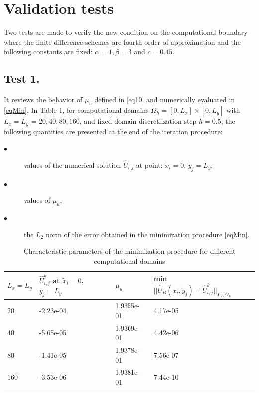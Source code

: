\documentclass[12pt]{article}
\theoremstyle{theorem}
\theoremstyle{defi}
\begin{document}
\section{Validation tests}

Two tests are made to verify the new condition on the computational boundary where the finite difference schemes are fourth order of approximation and the following constants are fixed:
 $\alpha = 1, \beta = 3$  and  $c = 0.45$.

\subsection{Test 1.}

It reviews the behavior of $\mu_u$  defined in  \eqref{eq10} and numerically evaluated in \eqref{eqMin}. In Table 1, for computational domains  $\tilde \Omega_h = [0, L_{ x}] \times  [0, L_{ y}]$
with $ L_{ x} = L_{ y}$ = $20, 40, 80, 160$, and fixed domain discretiization step $h = 0.5$, the following quantities are presented at the end of the iteration procedure:

\begin{description}
  \item[$\bullet$]values of the numerical solution $\widehat{U}_{i,j}$  at point: $\tilde {x}_i = 0$, $ \tilde {y}_j =   L_{ y}$,
  \item[$\bullet$ ] values of $\mu_u$,
  \item[$\bullet$ ] the $L_2$  norm of the error obtained in the minimization procedure \eqref{eqMin}.
\end{description}


\begin{center}
\begin{table}[ht]
\centering
		\begin{tabular}{||C{1.5cm}||C{2.6cm}|C{1.9cm}|C{4.2cm}||}
			\hline
			\hline
      $ L_{ x} = L_{ y}$        &         $\widehat{U}_{i,j}^k$ at  $\tilde {x}_i = 0$, $ \tilde {y}_j =   L_{ y}$    &    $\mu_u$  &  min \mbox{ $|| \widehat  U_B( \tilde x_i, \tilde y_j) - \widehat U ^k_{i,j} ||_{L_2,\Omega_B}$}\\
   			\hline
			    & -2.23e-04    &  1.9355e-01  &     4.17e-05  \\
               	       & -5.65e-05   &   1.9369e-01    &    4.42e-06 \\
			    & -1.41e-05  &      1.9378e-01      &       7.56e-07  \\
			     & -3.53e-06  &    1.9381e-01        &     7.44e-10 \\
		   \hline
	             \hline
                     \end{tabular}
\caption{Characteristic parameters of the minimization procedure for different computational domains}
\label{tab:fourth-der}
\end{table}
\end{center}
\end{document}
